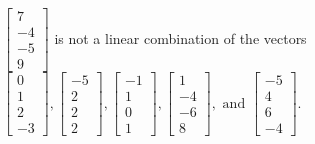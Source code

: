 \begin{exercise}
\begin{exerciseStatement}
  \end{exerciseStatement}
  \begin{exerciseAnswer}
   \(\left[\begin{array}{c}
7 \\
-4 \\
-5 \\
9
\end{array}\right]\) 
  	 is not  
	a linear combination of the vectors \(\left[\begin{array}{c}
0 \\
1 \\
2 \\
-3
\end{array}\right] , \left[\begin{array}{c}
-5 \\
2 \\
2 \\
2
\end{array}\right] , \left[\begin{array}{c}
-1 \\
1 \\
0 \\
1
\end{array}\right] , \left[\begin{array}{c}
1 \\
-4 \\
-6 \\
8
\end{array}\right] , \text{ and } \left[\begin{array}{c}
-5 \\
4 \\
6 \\
-4
\end{array}\right]\).

	
  


  \end{exerciseAnswer}
\end{exercise}